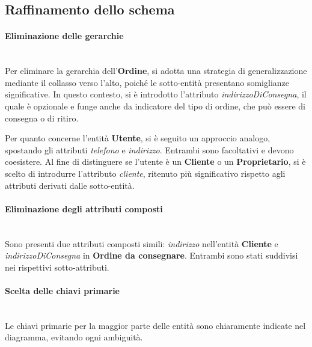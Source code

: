 \documentclass[a4paper,12pt, oneside]{article}
\begin{document}
\subsection{Raffinamento dello schema}

\paragraph{Eliminazione delle gerarchie}
\hphantom{A}\\    %
Per eliminare la gerarchia dell'\textbf{Ordine}, si adotta una
strategia di generalizzazione mediante il collasso verso
l'alto, poiché le sotto-entità presentano somiglianze
significative. In questo contesto, si è introdotto l'attributo
\textit{indirizzoDiConsegna}, il quale è opzionale e funge
anche da indicatore del tipo di ordine, che può essere di
consegna o di ritiro.

Per quanto concerne l'entità \textbf{Utente}, si è seguito un
approccio analogo, spostando gli attributi \textit{telefono}
e \textit{indirizzo}. Entrambi sono facoltativi e devono
coesistere. Al fine di distinguere se l'utente è un
\textbf{Cliente} o un \textbf{Proprietario}, si è scelto di
introdurre l'attributo \textit{cliente}, ritenuto più
significativo rispetto agli attributi derivati dalle
sotto-entità.

\paragraph{Eliminazione degli attributi composti}
\hphantom{A}\\    %
Sono presenti due attributi composti simili: \textit{indirizzo}
nell'entità \textbf{Cliente} e \textit{indirizzoDiConsegna} in
\textbf{Ordine da consegnare}. Entrambi sono stati suddivisi
nei rispettivi sotto-attributi.

\paragraph{Scelta delle chiavi primarie}
\hphantom{A}\\    %
Le chiavi primarie per la maggior parte delle entità sono
chiaramente indicate nel diagramma, evitando ogni ambiguità.
\end{document}
